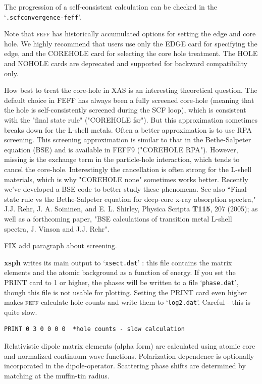 \documentclass[11pt,oneside]{report} %
\newcommand{\program}[1]{\textsc{#1}}
\newcommand{\feff}{\program{feff}}
\newcommand{\file}[1]{`\texttt{#1}'}
\newcommand{\module}[1]{\textrm{\bf{#1}}}
\begin{document}
The progression of a self-consistent calculation can be checked in the \file{.scfconvergence-feff}.

Note that {\feff} has historically accumulated options for setting the
edge and core hole.  We highly recommend that users use only the EDGE card for
specifying the edge, and the COREHOLE card for selecting the core hole treatment.
The HOLE and NOHOLE cards are deprecated and supported for backward compatibility only.

How best to treat the core-hole in XAS is an interesting theoretical question. The default choice in FEFF has always been a fully screened core-hole (meaning that the hole is self-consistently screened during the SCF loop), which is consistent with the "final state rule" ("COREHOLE fsr"). But this approximation sometimes breaks down for the L-shell metals. Often a better approximation is to use RPA screening.  This screening approximation is similar to that in the Bethe-Salpeter equation (BSE) and is available in FEFF9 ("COREHOLE RPA"). However, missing is the exchange term in the particle-hole interaction, which tends to cancel the core-hole. Interestingly the cancellation is often strong for the L-shell materials, which is why "COREHOLE none" sometimes works better. Recently we've developed a BSE code to better study these phenomena. See also ``Final-state rule vs the Bethe-Salpeter equation  for deep-core x-ray absorption spectra," J.J. Rehr, J. A. Soininen, and E. L. Shirley, Physica Scripta {\bf T115}, 207 (2005); as well as a forthcoming paper, "BSE calculations of transition metal L-shell spectra, J. Vinson and J.J. Rehr".


FIX add paragraph about screening.


\module{xsph} writes its main output to \file{xsect.dat} : this file contains the matrix elements and the atomic background as a function of energy.
If you set the PRINT card to 1 or higher, the phases will be written to a file \file{phase.dat}, though this file is not
usable for plotting.  Setting the PRINT card even higher makes {\feff} calculate hole counts and write them to \file{log2.dat}.  Careful - this is quite slow.
\begin{verbatim}
PRINT 0 3 0 0 0 0  *hole counts - slow calculation
\end{verbatim}

Relativistic dipole matrix elements (alpha form) are calculated using
atomic core and normalized continuum wave functions. Polarization
dependence is optionally incorporated in the dipole-operator.
Scattering phase shifts are determined by matching at the muffin-tin
radius. 
\end{document}
